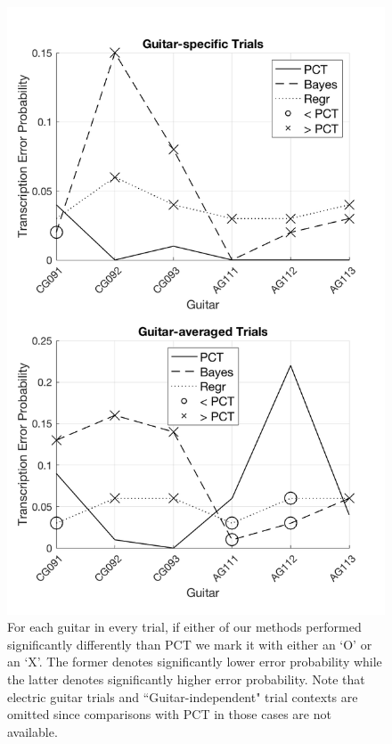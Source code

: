 \documentclass[convention,peer-reviewed]{aesconf}
\begin{document}
\begin{figure}[!htbp]
\centering
\includegraphics[scale=0.25]{sig-comp-PCT}
\caption{For each guitar in every trial, if either of our methods performed significantly differently than PCT we mark it with either an `O' or an `X'. The former denotes significantly lower error probability while the latter denotes significantly higher error probability. Note that electric guitar trials and ``Guitar-independent" trial contexts are omitted since comparisons with PCT in those cases are not available.}
\label{fig:sig-comp-PCT}
\end{figure}
\end{document}

